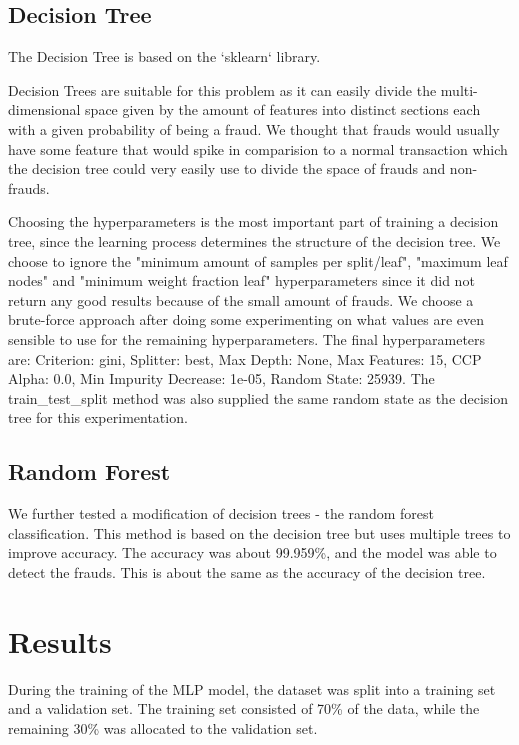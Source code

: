 \documentclass[a4paper, 10pt, conference]{ieeeconf}      %
\begin{document}
\subsection{Decision Tree}

The Decision Tree is based on the `sklearn` library. 

Decision Trees are suitable for this problem as it can easily divide the multi-dimensional space given by the amount of features into distinct sections each with a given probability of being a fraud.
We thought that frauds would usually have some feature that would spike in comparision to a normal transaction which the decision tree could very easily use to divide the space of frauds and non-frauds.

Choosing the hyperparameters is the most important part of training a decision tree, since the learning process determines the structure of the decision tree.
We choose to ignore the "minimum amount of samples per split/leaf", "maximum leaf nodes" and "minimum weight fraction leaf" hyperparameters since it did not return any good results because of the small amount of frauds.
We choose a brute-force approach after doing some experimenting on what values are even sensible to use for the remaining hyperparameters.
The final hyperparameters are: Criterion: gini, Splitter: best, Max Depth: None, Max Features: 15, CCP Alpha: 0.0, Min Impurity Decrease: 1e-05, Random State: 25939.
The train\_test\_split method was also supplied the same random state as the decision tree for this experimentation.

\subsection{Random Forest}

We further tested a modification of decision trees - the random forest classification. This method is based on the decision tree but uses multiple trees to improve accuracy. 
The accuracy was about 99.959\%, and the model was able to detect the frauds. This is about the same as the accuracy of the decision tree.

\section{Results}
\label{sec:results}
During the training of the MLP model, the dataset was split into a training set and a validation set. The training set consisted of 70\% of the data, while the remaining 30\% was allocated to the validation set.
\end{document}
